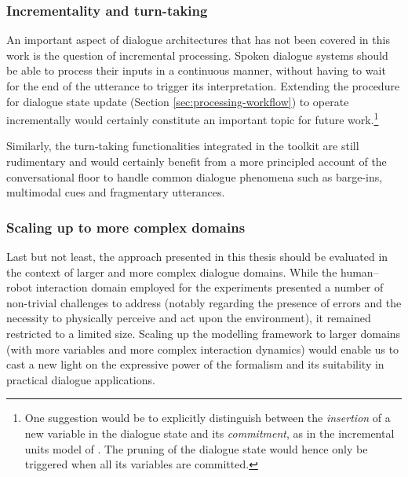 \subsubsection*{Incrementality and turn-taking}

An important aspect of dialogue architectures that has not been covered in this work is the question of incremental processing. Spoken dialogue systems should be able to process their inputs in a continuous manner, without having to wait for the end of the utterance to trigger its interpretation.  Extending the procedure for dialogue state update (Section \ref{sec:processing-workflow}) to operate incrementally would certainly constitute an important topic for future work.\footnote{One suggestion would be to explicitly distinguish between the \textit{insertion} of a new variable in the dialogue state and its \textit{commitment}, as in the incremental units model of \cite{schlangen2009general}.  The pruning of the dialogue state would hence only be triggered when all its variables are committed.}

Similarly, the turn-taking functionalities integrated in the \opendial toolkit are still rudimentary and would certainly benefit from a more principled account of the conversational floor to handle common dialogue phenomena such as barge-ins, multimodal cues and fragmentary utterances. 

\subsubsection*{Scaling up to more complex domains}

Last but not least, the approach presented in this thesis should be evaluated in the context of larger and more complex dialogue domains. While the human--robot interaction domain employed for the experiments presented a number of non-trivial challenges to address (notably regarding the presence of errors and the necessity to physically perceive and act upon the environment), it remained restricted to a limited size. Scaling up the modelling framework to larger domains (with more variables and more complex interaction dynamics) would enable us to cast a new light on the expressive power of the formalism and its suitability in practical dialogue applications. 

